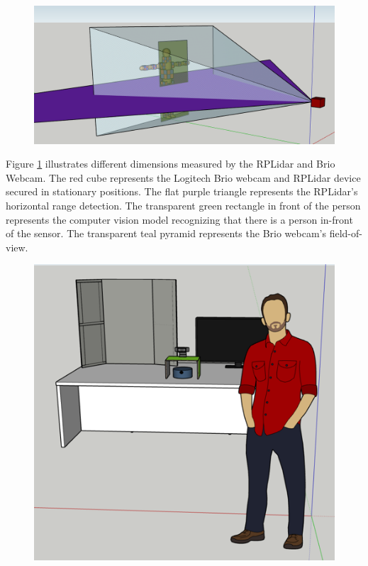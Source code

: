 \documentclass[onecolumn, draftclsnofoot,10pt, compsoc]{IEEEtran}
\begin{document}
\begin{singlespace}
			\begin{figure}[here]
				\includegraphics[scale=0.5]{different_dimensions.PNG}
				\label{dimensions}
			\end{figure}

			Figure \ref{dimensions} illustrates different dimensions measured by the RPLidar and Brio Webcam.
			The red cube represents the Logitech Brio webcam and RPLidar device secured in stationary positions.
			The flat purple triangle represents the RPLidar's horizontal range detection.
			The transparent green rectangle in front of the person represents the computer vision model recognizing that there is a person in-front of the sensor.
			The transparent teal pyramid represents the Brio webcam's field-of-view.
			
			\begin{figure}[here]
				\includegraphics[scale=0.5]{expo.PNG}
				\label{expo}
			\end{figure}


\end{singlespace}
\end{document}
